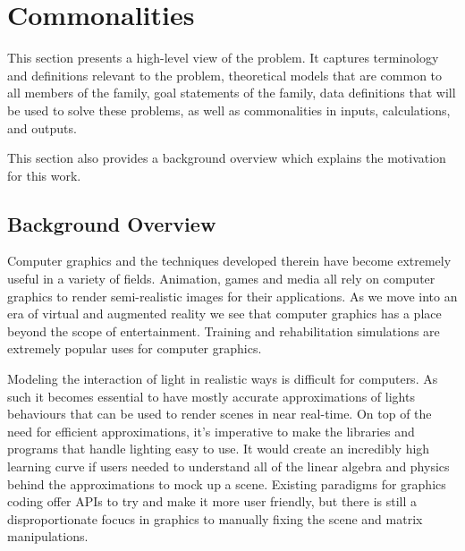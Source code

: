 \documentclass[12pt]{article}
\begin{document}
%

\section{Commonalities}
This section presents a high-level view of the problem. It captures terminology 
and definitions relevant to the problem, theoretical models that are common to 
all members of the family, goal statements of the family, data definitions that 
will be used to solve these problems, as well as commonalities in inputs, 
calculations, and outputs.

This section also provides a background overview which explains the motivation 
for this work.

\subsection{Background Overview} \label{Sec_Background}
Computer graphics and the techniques developed therein have become extremely 
useful in a variety of fields. Animation, games and media all rely on computer 
graphics to render semi-realistic images for their applications. As we move 
into an era of virtual and augmented reality we see that computer graphics has 
a place beyond the scope of entertainment. Training and rehabilitation 
simulations are extremely popular uses for computer graphics.

Modeling the interaction of light in realistic ways is difficult for computers. 
As such it becomes essential to have mostly accurate approximations of lights 
behaviours that can be used to render scenes in near real-time. On top of the 
need for efficient approximations, it's imperative to make the libraries and 
programs that handle lighting easy to use. It would create an incredibly high 
learning curve if users needed to understand all of the linear algebra and 
physics behind the approximations to mock up a scene. Existing paradigms for 
graphics coding offer APIs to try and make it more user friendly, but there is 
still a disproportionate focucs in graphics to manually fixing the scene and 
matrix manipulations. 
\end{document}
